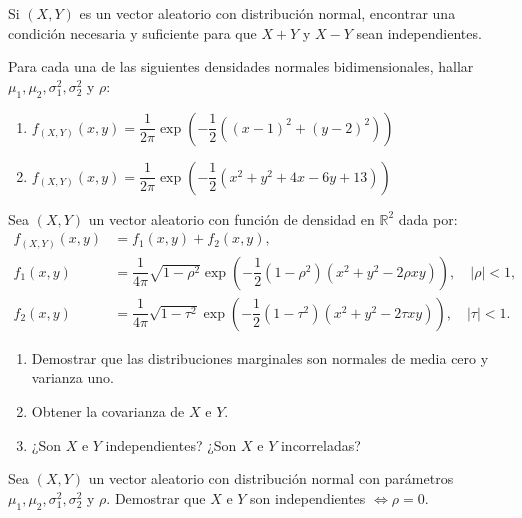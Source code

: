 \begin{ejercicio}
    Si $(X,Y)$ es un vector aleatorio con distribución normal, encontrar una condición necesaria y suficiente para que $X + Y$ y $X - Y$ sean independientes.
\end{ejercicio}

\begin{ejercicio}
    Para cada una de las siguientes densidades normales bidimensionales, hallar $\mu_1,\mu_2,\sigma_1^2,\sigma_2^2$ y $\rho$:
    \begin{enumerate}
        \item $f_{(X,Y)}(x, y) = \dfrac{1}{2\pi}\exp\left(-\dfrac{1}{2}((x-1)^2 + (y-2)^2)\right)$
        \item $f_{(X,Y)}(x, y) = \dfrac{1}{2\pi}\exp\left(-\dfrac{1}{2}(x^2 +y^2 +4x-6y+13)\right)$
    \end{enumerate}
\end{ejercicio}

\begin{ejercicio}
    Sea $(X,Y)$ un vector aleatorio con función de densidad en $\mathbb{R}^2$ dada por:
    \begin{align*}
        f_{(X,Y)}(x, y) &= f_1(x, y) + f_2(x, y),\\
        f_1(x, y) &= \dfrac{1}{4\pi}\sqrt{1-\rho^2}\exp\left(-\dfrac{1}{2}(1-\rho^2)(x^2 +y^2 -2\rho xy)\right),\quad |\rho| < 1,\\
        f_2(x, y) &= \dfrac{1}{4\pi}\sqrt{1-\tau^2}\exp\left(-\dfrac{1}{2}(1-\tau^2)(x^2 +y^2 -2\tau xy)\right),\quad |\tau| < 1.
    \end{align*}
    
    \begin{enumerate}
        \item Demostrar que las distribuciones marginales son normales de media cero y varianza uno.
        \item Obtener la covarianza de $X$ e $Y$.
        \item ¿Son $X$ e $Y$ independientes? ¿Son $X$ e $Y$ incorreladas?
    \end{enumerate}
\end{ejercicio}

\begin{ejercicio}
    Sea $(X,Y)$ un vector aleatorio con distribución normal con parámetros $\mu_1,\mu_2,\sigma_1^2,\sigma_2^2$ y $\rho$. Demostrar que $X$ e $Y$ son independientes $\Leftrightarrow \rho = 0$.
\end{ejercicio}